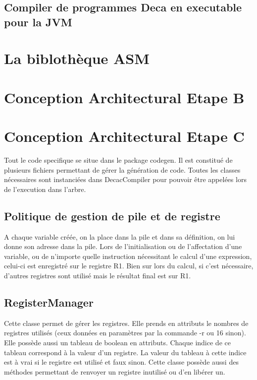 \documentclass[12pt, a4paper, one side]{article}
\begin{document}
    \subsection{Compiler de programmes Deca en executable pour la JVM}
    \section{La biblothèque ASM}

\newpage

\section{Conception Architectural Etape B}

\section{Conception Architectural Etape C}

Tout le code specifique se situe dans le package codegen. Il est constitué de plusieurs fichiers
permettant de gérer la génération de code. Toutes les classes nécessaires sont instanciées dans DecacCompiler
pour pouvoir être appelées lors de l'execution dans l'arbre.

\subsection{Politique de gestion de pile et de registre}

A chaque variable créée, on la place dans la pile et dans sa définition, on lui donne son adresse dans la pile.
Lors de l'initialisation ou de l'affectation d'une variable, ou de n'importe quelle instruction nécessitant le
calcul d'une expression, celui-ci est enregistré sur le registre R1. Bien sur lors du calcul, si c'est nécessaire,
d'autres registres sont utilisé mais le résultat final est sur R1.

\subsection{RegisterManager}

Cette classe permet de gérer les registres. Elle prends en attributs le nombres de registres utilisés
(ceux données en paramètres par la commande -r ou 16 sinon). Elle possède aussi un tableau de boolean
en attributs. Chaque indice de ce tableau correspond à la valeur d'un registre. La valeur du tableau
à cette indice est à vrai si le registre est utilisé et faux sinon. Cette classe possède aussi des
méthodes permettant de renvoyer un registre inutilisé ou d'en libérer un.
\end{document}

